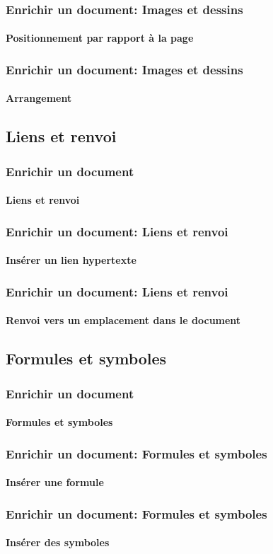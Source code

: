 \documentclass[xcolor=table]{beamer}
\begin{document}
\begin{frame}
\frametitle{Enrichir un document: Images et dessins}
\framesubtitle{Positionnement par rapport à la page}

\end{frame}

\begin{frame}
\frametitle{Enrichir un document: Images et dessins}
\framesubtitle{Arrangement}

\end{frame}

\subsection{Liens et renvoi}

\begin{frame}
\frametitle{Enrichir un document}
\framesubtitle{Liens et renvoi}

\end{frame}

\begin{frame}
\frametitle{Enrichir un document: Liens et renvoi}
\framesubtitle{Insérer un lien hypertexte}

\end{frame}

\begin{frame}
\frametitle{Enrichir un document: Liens et renvoi}
\framesubtitle{Renvoi vers un emplacement dans le document}

\end{frame}

\subsection{Formules et symboles}

\begin{frame}
\frametitle{Enrichir un document}
\framesubtitle{Formules et symboles}

\end{frame}

\begin{frame}
\frametitle{Enrichir un document: Formules et symboles}
\framesubtitle{Insérer une formule}

\end{frame}

\begin{frame}
\frametitle{Enrichir un document: Formules et symboles}
\framesubtitle{Insérer des symboles}

\end{frame}
\end{document}
